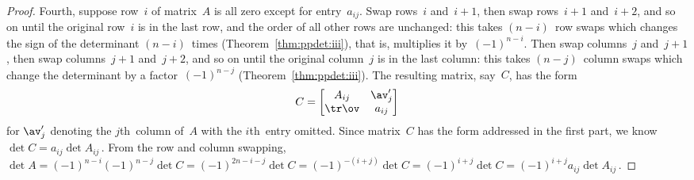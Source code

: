 \begin{proof}
Fourth, suppose row~\(i\) of matrix~\(A\) is all zero except for entry~\(a_{ij}\).
Swap rows~\(i\) and~\(i+1\), then swap rows~\(i+1\) and~\(i+2\), and so on until the original row~\(i\) is in the last row, and the order of all other rows are unchanged: this takes \((n-i)\)~row swaps which changes the sign of the determinant \((n-i)\)~times (Theorem~\ref{thm:ppdet:iii}), that is, multiplies it by~\((-1)^{n-i}\).
Then swap columns~\(j\) and~\(j+1\), then swap columns~\(j+1\) and~\(j+2\), and so on until the original column~\(j\) is in the last column: this takes \((n-j)\)~column swaps which change the determinant by a factor~\((-1)^{n-j}\) (Theorem~\ref{thm:ppdet:iii}).
The resulting matrix, say~\(C\), has the form
\begin{equation*}
C=\begin{bmatrix} A_{ij}&\av'_j\\\tr\ov&a_{ij} \end{bmatrix}
\end{equation*}
for \(\av'_j\) denoting the \(j\)th~column of~\(A\) with the \(i\)th~entry omitted.
Since matrix~\(C\) has the form addressed in the first part, we know \(\det C=a_{ij}\det A_{ij}\)\,.
From the row and column swapping, \(\det A=(-1)^{n-i}(-1)^{n-j}\det C =(-1)^{2n-i-j}\det C =(-1)^{-(i+j)}\det C =(-1)^{i+j}\det C =(-1)^{i+j}a_{ij}\det A_{ij}\)\,.
\end{proof}




